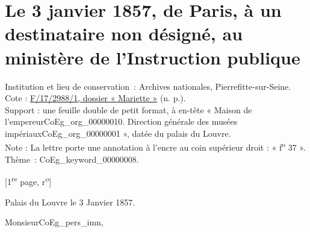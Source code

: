 \documentclass{book}
\begin{document}
\hypertarget{CoEg_Mariette_1857-01-03}{}

\section*{Le 3 janvier 1857, de Paris, à un destinataire non désigné, au ministère de l'Instruction publique}
 \label{labCoEg_Mariette_1857-01-03}
{\footnotesize
\noindent Institution et lieu de conservation~: Archives nationales, Pierrefitte-sur-Seine.\\
Cote : \hyperlink{CoEg_Mariette_ms_002}{F/17/2988/1, dossier « Mariette »} (n. p.).\\
Support : une feuille double de petit format, à en-tête « Maison de l’empereur\gls{CoEg_org_00000010}. Direction générale des musées impériaux\gls{CoEg_org_00000001} », datée du palais du Louvre.\\
Note : La lettre porte une annotation à l'encre au coin supérieur droit : « f\textsuperscript{o} 37 ».\\
Thème~: \gls{CoEg_keyword_00000008}.}

{\footnotesize\begin{center} {[1\textsuperscript{re} page, r\textsuperscript{o}]}\end{center}}
\begin{flushright}Palais du Louvre le 3 Janvier 1857.\end{flushright}

\hspace{1cm} Monsieur\gls{CoEg_pers_imn},\\
\end{document}
